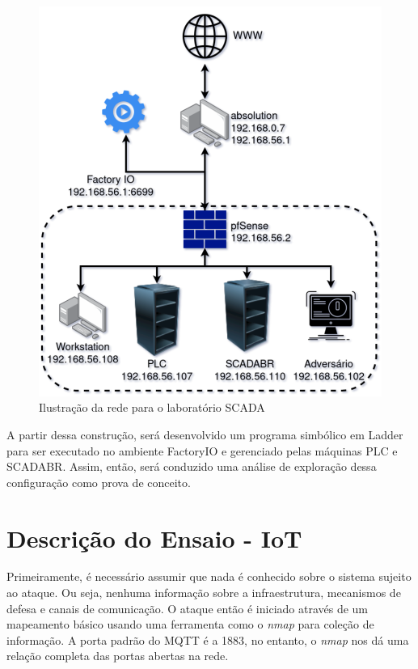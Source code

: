 \documentclass[tcc,capa]{texufpel}
\begin{document}
\begin{figure}[h]
        \centering
        \includegraphics[scale=0.5]{figs/scada-net.png}
        \caption{Ilustração da rede para o laboratório SCADA}
        \label{fig:scada-net}
\end{figure}

A partir dessa construção, será desenvolvido um programa simbólico em Ladder para ser executado no ambiente FactoryIO e gerenciado pelas máquinas PLC e SCADABR. Assim, então, será
conduzido uma análise de exploração dessa configuração como prova de conceito.

\section{Descrição do Ensaio - IoT}
Primeiramente, é necessário assumir que nada é conhecido sobre o sistema sujeito ao ataque. Ou seja, nenhuma informação sobre a infraestrutura, mecanismos de defesa e canais de
comunicação. 
O ataque então é iniciado através de um mapeamento básico usando uma ferramenta como o \textit{nmap} para coleção de informação. A porta padrão do MQTT é a 1883, no entanto, o
\textit{nmap} nos dá uma relação completa das portas abertas na rede.
\end{document}

